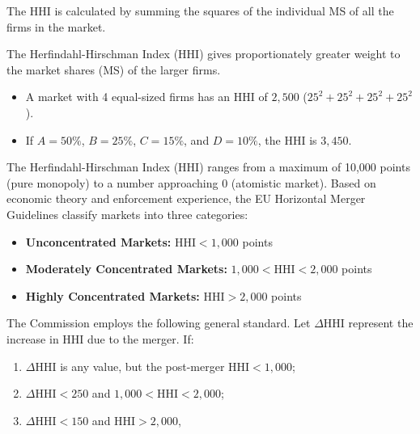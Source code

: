            The HHI is calculated by summing the squares of the individual MS of all the firms in the market.

            The Herfindahl-Hirschman Index (HHI) gives proportionately greater weight to the market shares (MS) of the larger firms.

            \begin{itemize}
                \item A market with 4 equal-sized firms has an HHI of \( 2,500 \) (\( 25^2 + 25^2 + 25^2 + 25^2 \)).
                \item If \( A = 50\% \), \( B = 25\% \), \( C = 15\% \), and \( D = 10\% \), the HHI is \( 3,450 \).
            \end{itemize}
            

            The Herfindahl-Hirschman Index (HHI) ranges from a maximum of 10,000 points (pure monopoly) to a number approaching 0 (atomistic market). Based on economic theory and enforcement experience, the EU Horizontal Merger Guidelines classify markets into three categories:

            \begin{itemize}
                \item \textbf{Unconcentrated Markets:} \( \text{HHI} < 1,000 \) points
                \item \textbf{Moderately Concentrated Markets:} \( 1,000 < \text{HHI} < 2,000 \) points
                \item \textbf{Highly Concentrated Markets:} \( \text{HHI} > 2,000 \) points
            \end{itemize}
            
            The Commission employs the following general standard. Let \( \Delta \text{HHI} \) represent the increase in HHI due to the merger. If:
            
            \begin{enumerate}[label=\alph*.]
                \item \( \Delta \text{HHI} \) is any value, but the post-merger \( \text{HHI} < 1,000 \);
                \item \( \Delta \text{HHI} < 250 \) and \( 1,000 < \text{HHI} < 2,000 \);
                \item \( \Delta \text{HHI} < 150 \) and \( \text{HHI} > 2,000 \),
            \end{enumerate}
            
